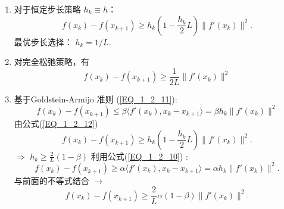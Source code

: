 \documentclass[handout]{beamer}
\begin{document}
\begin{frame}[allowframebreaks]
\begin{enumerate}
\item 对于恒定步长策略 $h_k \equiv h$：
$$
    f(x_k) - f(x_{k+1}^{}) \geq   h_k (1-\frac{h_k}{2}L) \|f'(x_k)\|^2.
$$
 最优步长选择： $h_k = 1/L$.

\item 对完全松弛策略，有
$$
    f(x_k) - f(x_{k+1}^{}) \geq   \frac{1}{2L} \|f'(x_k)\|^2
$$


\item  基于Goldstein-Armijo 准则 (\ref{EQ_1_2_11}): 
$$
    f(x_k) - f(x_{k+1}^{}) \leq   \beta \langle f'(x_k),x_k-x_{k+1} \rangle  = \beta h_{k}^{} \|f'(x_k)\|^2
$$
由公式(\ref{EQ_1_2_12}) 
$$
    f(x_k) - f(x_{k+1}^{}) \geq    h_{k}^{}(1-\frac{h_k}{2} L) \|f'(x_k)\|^2.
$$
$\Rightarrow$ $h_k \geq \frac{2}{L} (1-\beta)$
利用公式(\ref{EQ_1_2_10}) : 
$$
    f(x_k) - f(x_{k+1}^{}) \geq \alpha \langle f'(x_k),x_k-x_{k+1} \rangle  = \alpha h_k \|f'(x_k)\|^2.
$$
与前面的不等式结合  $\rightarrow$
$$
  f(x_k) - f(x_{k+1}^{}) \geq  \frac{2}{L} \alpha (1-\beta)  \|f'(x_k)\|^2.
$$

\end{enumerate}


\end{frame}
\end{document}
